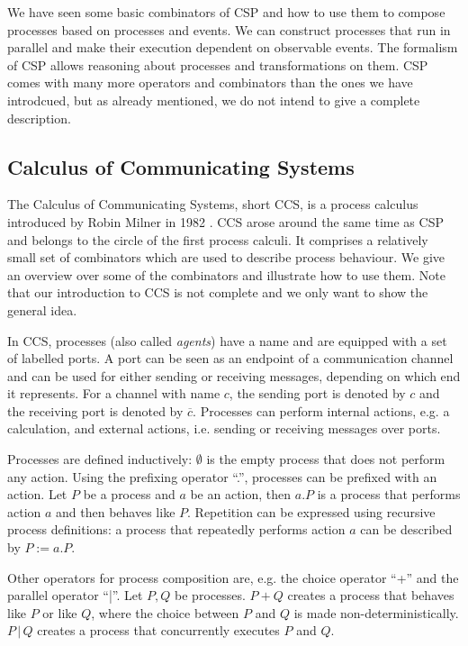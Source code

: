 We have seen some basic combinators of \textsc{CSP} and how to use them to compose processes based on processes and events. We can construct processes that run in parallel and make their execution dependent on observable events. The formalism of \textsc{CSP} allows reasoning about processes and transformations on them. \textsc{CSP} comes with many more operators and combinators than the ones we have introdcued, but as already mentioned, we do not intend to give a complete description.


\subsection{Calculus of Communicating Systems}
The Calculus of Communicating Systems, short \textsc{CCS}, is a process calculus introduced by Robin Milner in 1982 \cite{Milner:1982:CCS:539036}. \textsc{CCS} arose around the same time as \textsc{CSP} and belongs to the circle of the first process calculi. It comprises a relatively small set of combinators which are used to describe process behaviour. We give an overview over some of the combinators and illustrate how to use them. Note that our introduction to \textsc{CCS} is not complete and we only want to show the general idea.

In \textsc{CCS}, processes (also called \textit{agents}) have a name and are equipped with a set of labelled ports. A port can be seen as an endpoint of a communication channel and can be used for either sending or receiving messages, depending on which end it represents. For a channel with name $c$, the sending port is denoted by $c$ and the receiving port is denoted by $\overline{c}$. Processes can perform internal actions, e.g. a calculation, and external actions, i.e. sending or receiving messages over ports. 

Processes are defined inductively: $\emptyset$ is the empty process that does not perform any action. Using the prefixing operator \enquote{.}, processes can be prefixed with an action. Let $P$ be a process and $a$ be an action, then $a.P$ is a process that performs action $a$ and then behaves like $P$. Repetition can be expressed using recursive process definitions: a process that repeatedly performs action $a$ can be described by $P := a.P$.

Other operators for process composition are, e.g. the choice operator \enquote{+} and the parallel operator \enquote{|}. Let $P, Q$ be processes. $P + Q$ creates a process that behaves like $P$ or like $Q$, where the choice between $P$ and $Q$ is made non-deterministically. $P \,|\, Q$ creates a process that concurrently executes $P$ and $Q$.

